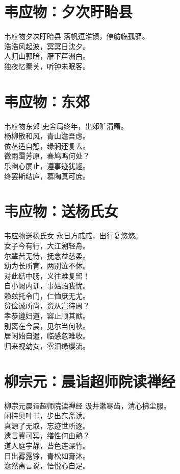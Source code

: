 \documentclass[12pt,oneside,a5paper]{book}
\begin{document}
\chapter{韦应物：夕次盱眙县}
\begin{poemzh}{韦应物}{夕次盱眙县}
落帆逗淮镇，停舫临孤驿。\\
浩浩风起波，冥冥日沈夕。\\
人归山郭暗，雁下芦洲白。\\
独夜忆秦关，听钟未眠客。\\ 
\end{poemzh}

\chapter{韦应物：东郊}
\begin{poemzh}{韦应物}{东郊}
吏舍局终年，出郊旷清曙。\\
杨柳散和风，青山澹吾虑。\\
依丛适自憩，缘涧还复去。\\
微雨霭芳原，春鸠鸣何处？\\
乐幽心屡止，遵事迹犹遽。\\
终罢斯结庐，慕陶真可庶。\\ 
\end{poemzh}

\chapter{韦应物：送杨氏女}
\begin{poemzh}{韦应物}{送杨氏女}
永日方戚戚，出行复悠悠。\\
女子今有行，大江溯轻舟。\\
尔辈苦无恃，抚念益慈柔。\\
幼为长所育，两别泣不休。\\
对此结中肠，义往难复留！\\
自小阙内训，事姑贻我忧。\\
赖兹托令门，仁恤庶无尤。\\
贫俭诚所尚，资从岂待周？\\
孝恭遵妇道，容止顺其猷。\\
别离在今晨，见尔当何秋。\\
居闲始自遣，临感忽难收。\\
归来视幼女，零泪缘缨流。\\ 
\end{poemzh}

\chapter{柳宗元：晨诣超师院读禅经}
\begin{poemzh}{柳宗元}{晨诣超师院读禅经}
汲井漱寒齿，清心拂尘服。\\
闲持贝叶书，步出东斋读。\\
真源了无取，忘迹世所逐。\\
遗言冀可冥，缮性何由熟？\\
道人庭宇静，苔色连深竹。\\
日出雾露馀，青松如膏沐。\\
澹然离言说，悟悦心自足。\\ 
\end{poemzh}
\end{document}
